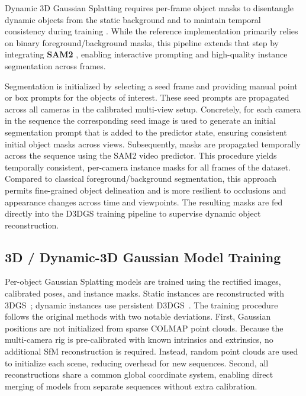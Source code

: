 Dynamic 3D Gaussian Splatting requires per-frame object masks to disentangle dynamic objects from the static background and to maintain temporal consistency during training \cite{luiten2024dynamic}. While the reference implementation primarily relies on binary foreground/background masks, this pipeline extends that step by integrating \textbf{SAM2} \cite{ravi2024sam2}, enabling interactive prompting and high-quality instance segmentation across frames.

Segmentation is initialized by selecting a seed frame and providing manual point or box prompts for the objects of interest. These seed prompts are propagated across all cameras in the calibrated multi-view setup. Concretely, for each camera in the sequence the corresponding seed image is used to generate an initial segmentation prompt that is added to the predictor state, ensuring consistent initial object masks across views. Subsequently, masks are propagated temporally across the sequence using the SAM2 video predictor. This procedure yields temporally consistent, per-camera instance masks for all frames of the dataset. Compared to classical foreground/background segmentation, this approach permits fine-grained object delineation and is more resilient to occlusions and appearance changes across time and viewpoints. The resulting masks are fed directly into the D3DGS training pipeline to supervise dynamic object reconstruction.




\subsection{3D / Dynamic-3D Gaussian Model Training}
\label{sec:modeltraining}

Per-object Gaussian Splatting models are trained using the rectified images, calibrated poses, and instance masks. 
Static instances are reconstructed with 3DGS~\cite{kerbl3Dgaussians}; dynamic instances use persistent D3DGS~\cite{luiten2024dynamic}. 
The training procedure follows the original methods with two notable deviations. First, Gaussian positions are not initialized from sparse COLMAP point clouds. Because the multi-camera rig is pre-calibrated with known intrinsics and extrinsics, no additional SfM reconstruction is required. Instead, random point clouds are used to initialize each scene, reducing overhead for new sequences. Second, all reconstructions share a common global coordinate system, enabling direct merging of models from separate sequences without extra calibration.

